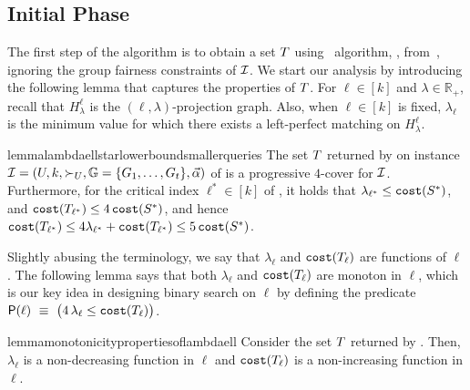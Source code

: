 \subsection{Initial Phase}\label{sec:4-approximate-k-center-algorithm}
The first step of the algorithm is to obtain a set $T$ using~\citet{burkhardt2024low} algorithm, \bcfrss, from~, ignoring the group fairness constraints of $\mathcal{I}$.
We start our analysis by introducing the following lemma that captures the properties of $T$. 
For $\ell\in [k]$ and $\lambda \in \mathbb{R}_+$, recall that $H^{\ell}_{\lambda}$ is the $(\ell,\lambda)$-projection graph. Also, when $\ell \in [k]$ is fixed, $\lambda_{\ell}$ is the minimum value for which there exists a {left-perfect matching} on $H^{\ell}_{\lambda}$. 

\begin{restatable}{lemma}{lambdaellstarlowerboundsmallerqueries}
    \label{lemma:lambda-ell-star-lower-bound-smaller-queries}
    The set $T$ returned by \bcfrss on instance $\mathcal{I}=(U,k, \succ_U, \mathbb{G}=\{G_1,\dots,G_t\},\vec{\alpha})$ of \ordfairkcen is
    a progressive $4$-cover for $\mathcal{I}$.
    Furthermore, for the critical index $\ell^* \in [k]$ of \OptSolSet, it holds that
    $\lambda_{\ell^*} \leq \texttt{cost}(S^*)$, and $\texttt{cost}(T_{\ell^*}) \leq 4\, \texttt{cost}(S^*)$, and hence $\texttt{cost}(T_{\ell^*}) \leq 4\lambda_{\ell^*} + \texttt{cost}(T_{\ell^*}) \leq 5\, \texttt{cost}(S^*)$.
\end{restatable}








Slightly abusing the terminology, we say that $\lambda_\ell$ and $\texttt{cost}(T_{\ell})$ are functions of $\ell$. The following lemma says that both $\lambda_{\ell}$ and $\texttt{cost}(T_{\ell})$ are monoton in $\ell$, which is our key idea in designing binary search on $\ell$ by defining the predicate $\mathsf{P}(\ell) ~\equiv~ \bigl( 4\,\lambda_{\ell} \leq \texttt{cost}(T_{\ell}) \bigr)$. 

\begin{restatable}{lemma}{monotonicitypropertiesoflambdaell}
    \label{lemma:monotonicity-properties-of-lambda-ell}
    Consider the set $T$ returned by \bcfrss. Then,    $\lambda_{\ell}$ is a non-decreasing function in $\ell$ and $\texttt{cost}(T_{\ell})$ is a non-increasing function in $\ell$.
\end{restatable}

